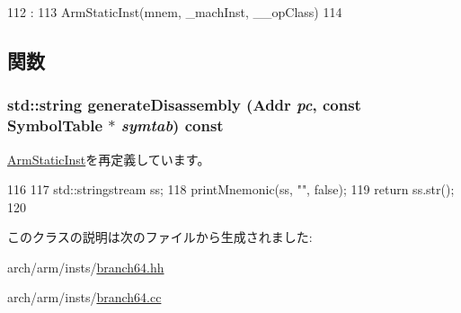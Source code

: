 \begin{DoxyCode}
112                                                                              :
113         ArmStaticInst(mnem, _machInst, __opClass)
114     {}

\end{DoxyCode}


\subsection{関数}
\hypertarget{classArmISA_1_1BranchEret64_a95d323a22a5f07e14d6b4c9385a91896}{
\subsubsection[{generateDisassembly}]{\setlength{\rightskip}{0pt plus 5cm}std::string generateDisassembly ({\bf Addr} {\em pc}, \/  const SymbolTable $\ast$ {\em symtab}) const}}
\label{classArmISA_1_1BranchEret64_a95d323a22a5f07e14d6b4c9385a91896}


\hyperlink{classArmISA_1_1ArmStaticInst_a95d323a22a5f07e14d6b4c9385a91896}{ArmStaticInst}を再定義しています。


\begin{DoxyCode}
116 {
117     std::stringstream ss;
118     printMnemonic(ss, "", false);
119     return ss.str();
120 }
\end{DoxyCode}


このクラスの説明は次のファイルから生成されました:\begin{DoxyCompactItemize}
\item 
arch/arm/insts/\hyperlink{branch64_8hh}{branch64.hh}\item 
arch/arm/insts/\hyperlink{branch64_8cc}{branch64.cc}\end{DoxyCompactItemize}

